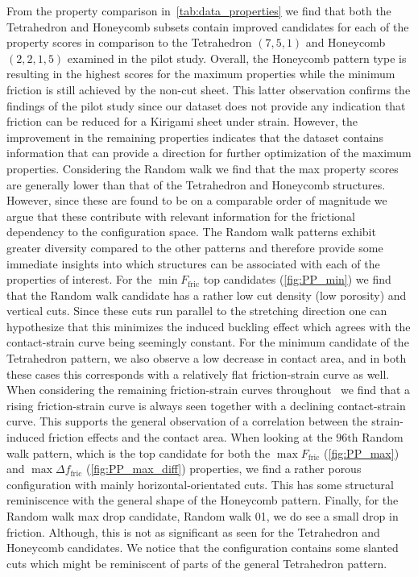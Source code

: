 From the property comparison in~\cref{tab:data_properties} we find that both the
Tetrahedron and Honeycomb subsets contain improved candidates for each of the
property scores in comparison to the Tetrahedron $(7,5,1)$ and Honeycomb
$(2,2,1,5)$ examined in the pilot study. Overall, the Honeycomb pattern type is
resulting in the highest scores for the maximum properties while the minimum
friction is still achieved by the non-cut sheet. This latter observation
confirms the findings of the pilot study since our dataset does not provide any
indication that friction can be reduced for a Kirigami sheet under strain.
However, the improvement in the remaining properties indicates that the dataset
contains information that can provide a direction for further optimization of
the maximum properties. Considering the Random walk we find that the max
property scores are generally lower than that of the Tetrahedron and Honeycomb
structures. However, since these are found to be on a comparable order of
magnitude we argue that these contribute with relevant information for the
frictional dependency to the configuration space. The Random walk patterns
exhibit greater diversity compared to the other patterns and therefore provide
some immediate insights into which structures can be associated with each of the
properties of interest. For the $\min F_{\text{fric}}$ top candidates
(\cref{fig:PP_min}) we find that the Random walk candidate has a rather low cut
density (low porosity) and vertical cuts. Since these cuts run parallel to
the stretching direction one can hypothesize that this minimizes the induced
buckling effect which agrees with the contact-strain curve being seemingly
constant. For the minimum candidate of the Tetrahedron pattern, we also observe
a low decrease in contact area, and in both these cases this corresponds with a
relatively flat friction-strain curve as well. When considering the remaining
friction-strain curves throughout~ we
find that a rising friction-strain curve is always seen together with a
declining contact-strain curve. This supports the general observation of a
correlation between the strain-induced friction effects and the contact area.
When looking at the $96\text{th}$ Random walk pattern, which is the top
candidate for both the $\max F_{\text{fric}}$ (\cref{fig:PP_max}) and $\max
\Delta f_{\text{fric}}$ (\cref{fig:PP_max_diff}) properties, we find a rather
porous configuration with mainly horizontal-orientated cuts. This has some
structural reminiscence with the general shape of the Honeycomb pattern.
Finally, for the Random walk max drop candidate, Random walk 01, we do see a
small drop in friction. Although, this is not as significant as seen for the
Tetrahedron and Honeycomb candidates. We notice that the configuration contains
some slanted cuts which might be reminiscent of parts of the general Tetrahedron
pattern. 




